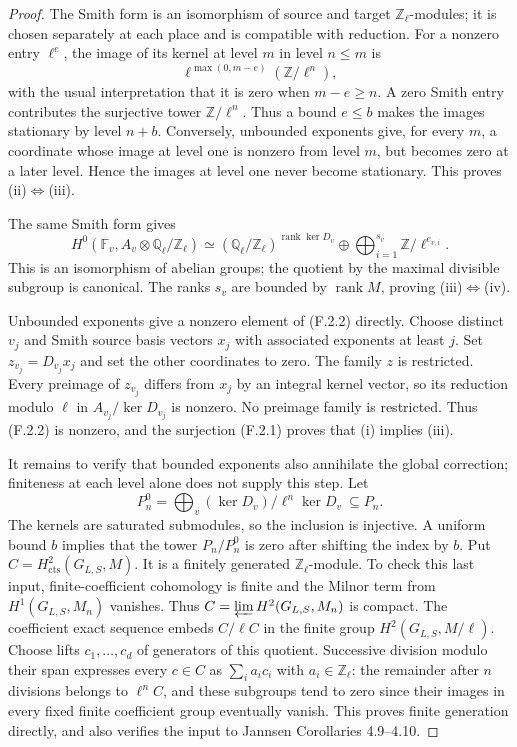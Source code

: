 \begin{proof}
The Smith form is an isomorphism of source and target $\mathbb Z_\ell$-modules; it is chosen separately at each place and is compatible with reduction. For a nonzero entry $\ell^e$, the image of its kernel at level $m$ in level $n\le m$ is
\[
 \ell^{\max(0,m-e)}(\mathbb Z/\ell^n),
\]
with the usual interpretation that it is zero when $m-e\ge n$. A zero Smith entry contributes the surjective tower $\mathbb Z/\ell^n$. Thus a bound $e\le b$ makes the images stationary by level $n+b$.
Conversely, unbounded exponents give, for every $m$, a coordinate whose image at level one is nonzero from level $m$, but becomes zero at a later level. Hence the images at level one never become stationary. This proves (ii)$\Leftrightarrow$(iii).

The same Smith form gives
\[
 H^0(\mathbb F_v,A_v\otimes\mathbb Q_\ell/\mathbb Z_\ell)
 \simeq
 (\mathbb Q_\ell/\mathbb Z_\ell)^{\operatorname{rank}\ker D_v}
 \oplus\bigoplus_{i=1}^{s_v}\mathbb Z/\ell^{e_{v,i}}.
\]
This is an isomorphism of abelian groups; the quotient by the maximal divisible subgroup is canonical. The ranks $s_v$ are bounded by $\operatorname{rank}M$, proving (iii)$\Leftrightarrow$(iv).

Unbounded exponents give a nonzero element of (F.2.2) directly. Choose distinct $v_j$ and Smith source basis vectors $x_j$ with associated exponents at least $j$. Set $z_{v_j}=D_{v_j}x_j$ and set the other coordinates to zero. The family $z$ is restricted. Every preimage of $z_{v_j}$ differs from $x_j$ by an integral kernel vector, so its reduction modulo $\ell$ in $A_{v_j}/\ker D_{v_j}$ is nonzero. No preimage family is restricted. Thus (F.2.2) is nonzero, and the surjection (F.2.1) proves that (i) implies (iii).

It remains to verify that bounded exponents also annihilate the global correction; finiteness at each level alone does not supply this step. Let
\[
 P_n^0=\bigoplus_v(\ker D_v)/\ell^n\ker D_v\ \subseteq P_n.
\]
The kernels are saturated submodules, so the inclusion is injective. A uniform bound $b$ implies that the tower $P_n/P_n^0$ is zero after shifting the index by $b$. Put $C=H^2_{\mathrm{cts}}(G_{L,S},M)$. It is a finitely generated $\mathbb Z_\ell$-module. To check this last input, finite-coefficient cohomology is finite and the Milnor term from $H^1(G_{L,S},M_n)$ vanishes. Thus $C=\varprojlim H^2(G_{L,S},M_n)$ is compact. The coefficient exact sequence embeds $C/\ell C$ in the finite group $H^2(G_{L,S},M/\ell)$. Choose lifts $c_1,\ldots,c_d$ of generators of this quotient. Successive division modulo their span expresses every $c\in C$ as $\sum_i a_i c_i$ with $a_i\in\mathbb Z_\ell$: the remainder after $n$ divisions belongs to $\ell^nC$, and these subgroups tend to zero since their images in every fixed finite coefficient group eventually vanish. This proves finite generation directly, and also verifies the input to Jannsen Corollaries 4.9--4.10.


\end{proof}
